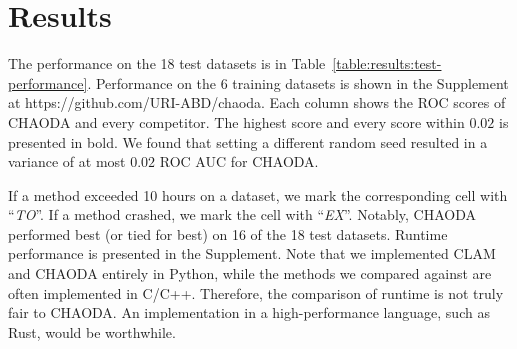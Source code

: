 \section{Results}
\label{sec:results}

The performance on the 18 test datasets is in Table~\ref{table:results:test-performance}.
Performance on the 6 training datasets is shown in the Supplement at https://github.com/URI-ABD/chaoda.
Each column shows the ROC scores of CHAODA and every competitor.
The highest score and every score within $0.02$ is presented in bold.
We found that setting a different random seed resulted in a variance of at most $0.02$ ROC AUC for CHAODA.

If a method exceeded 10 hours on a dataset, we mark the corresponding cell with ``\textit{TO}''.
If a method crashed, we mark the cell with ``\textit{EX}''.
Notably, CHAODA performed best (or tied for best) on 16 of the 18 test datasets.
Runtime performance is presented in the Supplement. 
Note that we implemented CLAM and CHAODA entirely in Python, while the methods we compared against are often implemented in C/C++.
Therefore, the comparison of runtime is not truly fair to CHAODA.
An implementation in a high-performance language, such as Rust, would be worthwhile.

